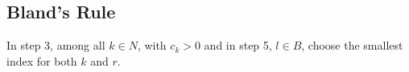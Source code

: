 \begin{thmbox}
    \subsection{Bland's Rule}
    In step 3, among all $k\in N$, with $c_k>0$ and in step 5, $l\in B$, 
    choose the smallest index for both $k$ and $r$.
\end{thmbox}

